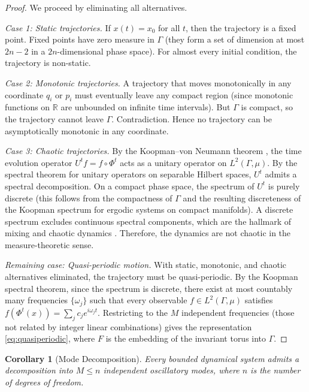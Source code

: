 \documentclass[11pt,twocolumn,a4paper]{article}
\newtheorem{corollary}[theorem]{Corollary}
\theoremstyle{definition}
\theoremstyle{remark}
\newcommand{\Real}{\mathbb{R}}
\begin{document}
\begin{proof}
We proceed by eliminating all alternatives.

\textit{Case 1: Static trajectories.} If $x(t) = x_0$ for all $t$, then the trajectory is a fixed point. Fixed points have zero measure in $\Gamma$ (they form a set of dimension at most $2n - 2$ in a $2n$-dimensional phase space). For almost every initial condition, the trajectory is non-static.

\textit{Case 2: Monotonic trajectories.} A trajectory that moves monotonically in any coordinate $q_i$ or $p_i$ must eventually leave any compact region (since monotonic functions on $\Real$ are unbounded on infinite time intervals). But $\Gamma$ is compact, so the trajectory cannot leave $\Gamma$. Contradiction. Hence no trajectory can be asymptotically monotonic in any coordinate.

\textit{Case 3: Chaotic trajectories.} By the Koopman--von Neumann theorem \citep{koopman1931}, the time evolution operator $U^t f = f \circ \Phi^t$ acts as a unitary operator on $L^2(\Gamma, \mu)$. By the spectral theorem for unitary operators on separable Hilbert spaces, $U^t$ admits a spectral decomposition. On a compact phase space, the spectrum of $U^t$ is purely discrete (this follows from the compactness of $\Gamma$ and the resulting discreteness of the Koopman spectrum for ergodic systems on compact manifolds). A discrete spectrum excludes continuous spectral components, which are the hallmark of mixing and chaotic dynamics \citep{arnold1963}. Therefore, the dynamics are not chaotic in the measure-theoretic sense.

\textit{Remaining case: Quasi-periodic motion.} With static, monotonic, and chaotic alternatives eliminated, the trajectory must be quasi-periodic. By the Koopman spectral theorem, since the spectrum is discrete, there exist at most countably many frequencies $\{\omega_j\}$ such that every observable $f \in L^2(\Gamma, \mu)$ satisfies $f(\Phi^t(x)) = \sum_j c_j e^{i \omega_j t}$. Restricting to the $M$ independent frequencies (those not related by integer linear combinations) gives the representation \eqref{eq:quasiperiodic}, where $F$ is the embedding of the invariant torus into $\Gamma$.
\end{proof}

\begin{corollary}[Mode Decomposition]\label{cor:modes}
Every bounded dynamical system admits a decomposition into $M \leq n$ independent oscillatory modes, where $n$ is the number of degrees of freedom.
\end{corollary}
\end{document}
